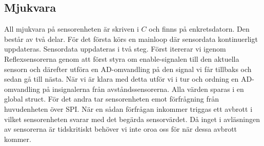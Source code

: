 \subsection{Mjukvara}

All mjukvara på sensorenheten är skriven i $C$ och finns på enkretsdatorn. Den består av två delar.
\newline
För det första körs en mainloop där sensordata kontinuerligt uppdateras. Sensordata uppdateras i två steg. Först itererar vi igenom Reflexsensorerna genom att först styra om enable-signalen till den aktuella sensorn och därefter utföra en AD-omvandling på den signal vi får tillbaks och sedan gå till nästa. När vi är klara med detta utför vi i tur och ordning en AD-omvandling på insignalerna från avståndssensorerna. Alla värden sparas i en global struct.
\newline
För det andra tar sensorenheten emot förfrågning från huvudenheten över SPI. När en sådan förfrågan inkommer triggas ett avbrott i vilket sensorenheten svarar med det begärda sensorvärdet. Då inget i avläsningen av sensorerna är tidskritiskt behöver vi inte oroa oss för när dessa avbrott kommer.
